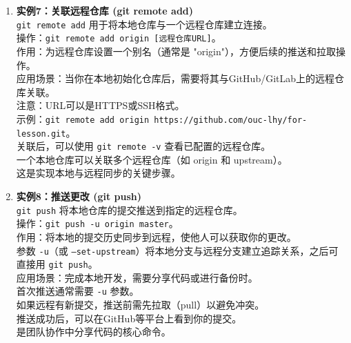 \documentclass[a4paper, 12pt]{article}
\begin{document}
\begin{enumerate}
    \item \begin{tcolorbox}[instancestyle]
        \textbf{实例7：关联远程仓库 (git remote add)} \\
        \texttt{git remote add} 用于将本地仓库与一个远程仓库建立连接。\\
        操作：\texttt{git remote add origin [远程仓库URL]}。\\
        作用：为远程仓库设置一个别名（通常是 "origin"），方便后续的推送和拉取操作。\\
        应用场景：当你在本地初始化仓库后，需要将其与GitHub/GitLab上的远程仓库关联。\\
        注意：URL可以是HTTPS或SSH格式。\\
        示例：\texttt{git remote add origin https://github.com/ouc-lhy/for-lesson.git}。\\
        关联后，可以使用 \texttt{git remote -v} 查看已配置的远程仓库。\\
        一个本地仓库可以关联多个远程仓库（如 origin 和 upstream）。\\
        这是实现本地与远程同步的关键步骤。
    \end{tcolorbox}

    \item \begin{tcolorbox}[instancestyle]
        \textbf{实例8：推送更改 (git push)} \\
        \texttt{git push} 将本地仓库的提交推送到指定的远程仓库。\\
        操作：\texttt{git push -u origin master}。\\
        作用：将本地的提交历史同步到远程，使他人可以获取你的更改。\\
        参数 \texttt{-u}（或 \texttt{--set-upstream}）将本地分支与远程分支建立追踪关系，之后可直接用 \texttt{git push}。\\
        应用场景：完成本地开发，需要分享代码或进行备份时。\\
        首次推送通常需要 \texttt{-u} 参数。\\
        如果远程有新提交，推送前需先拉取（pull）以避免冲突。\\
        推送成功后，可以在GitHub等平台上看到你的提交。\\
        是团队协作中分享代码的核心命令。
    \end{tcolorbox}


\end{enumerate}
\end{document}
